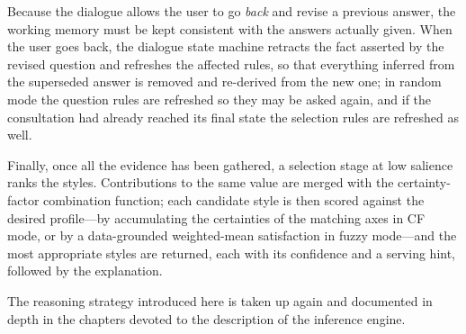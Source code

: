 Because the dialogue allows the user to go \emph{back} and revise a previous
answer, the working memory must be kept consistent with the answers actually
given. When the user goes back, the dialogue state machine retracts the fact
asserted by the revised question and refreshes the affected rules, so that
everything inferred from the superseded answer is removed and re-derived from the
new one; in random mode the question rules are refreshed so they may be asked
again, and if the consultation had already reached its final state the selection
rules are refreshed as well.

Finally, once all the evidence has been gathered, a selection stage at low
salience ranks the styles. Contributions to the same  value are
merged with the certainty-factor combination function; each candidate style is
then scored against the desired profile---by accumulating the certainties of the
matching axes in CF mode, or by a data-grounded weighted-mean satisfaction in
fuzzy mode---and the most appropriate styles are returned, each with its
confidence and a serving hint, followed by the explanation.

The reasoning strategy introduced here is taken up again and documented in depth
in the chapters devoted to the description of the inference engine.
